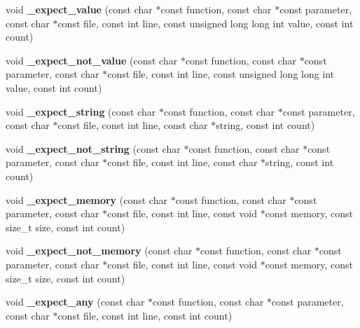 \begin{DoxyCompactItemize}
\item 
\mbox{\label{group__cmocka_gaaf65ff8bed7bf3ee6620c30fa6e46bb2}} 
void {\bfseries \+\_\+expect\+\_\+value} (const char $\ast$const function, const char $\ast$const parameter, const char $\ast$const file, const int line, const unsigned long long int value, const int count)
\item 
\mbox{\label{group__cmocka_ga40f389f487a677c18c7f26ef42338458}} 
void {\bfseries \+\_\+expect\+\_\+not\+\_\+value} (const char $\ast$const function, const char $\ast$const parameter, const char $\ast$const file, const int line, const unsigned long long int value, const int count)
\item 
\mbox{\label{group__cmocka_ga44532805b576ed147dab75c01536c4d2}} 
void {\bfseries \+\_\+expect\+\_\+string} (const char $\ast$const function, const char $\ast$const parameter, const char $\ast$const file, const int line, const char $\ast$string, const int count)
\item 
\mbox{\label{group__cmocka_gad11acecda2a0baeabe1ea8c6e117505b}} 
void {\bfseries \+\_\+expect\+\_\+not\+\_\+string} (const char $\ast$const function, const char $\ast$const parameter, const char $\ast$const file, const int line, const char $\ast$string, const int count)
\item 
\mbox{\label{group__cmocka_gae895cc4643158de732148ec4b9c93fd4}} 
void {\bfseries \+\_\+expect\+\_\+memory} (const char $\ast$const function, const char $\ast$const parameter, const char $\ast$const file, const int line, const void $\ast$const memory, const size\+\_\+t size, const int count)
\item 
\mbox{\label{group__cmocka_ga4d3dfed269e10dd263bf09862c53adc2}} 
void {\bfseries \+\_\+expect\+\_\+not\+\_\+memory} (const char $\ast$const function, const char $\ast$const parameter, const char $\ast$const file, const int line, const void $\ast$const memory, const size\+\_\+t size, const int count)
\item 
\mbox{\label{group__cmocka_gab22982f6b3960f277aba494bb7dec081}} 
void {\bfseries \+\_\+expect\+\_\+any} (const char $\ast$const function, const char $\ast$const parameter, const char $\ast$const file, const int line, const int count)

\end{DoxyCompactItemize}

